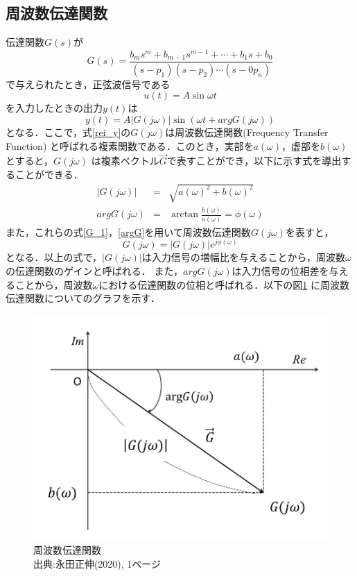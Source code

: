 \documentclass[a4paper,11pt]{jsarticle}
\begin{document}
\subsection{周波数伝達関数}
伝達関数$G(s)$が\\
\begin{equation}
  G(s) = \frac{b_ms^m+b_{m-1}s^{m-1}+\cdots + b_1s+b_0}{(s-p_1)(s-p_2)\cdots (s-0p_n)}
\end{equation}
で与えられたとき，正弦波信号である\\
\begin{equation}
  u(t) = A\sin{\omega t}
\end{equation}
を入力したときの出力$y(t)$は\\
\begin{equation}
  y(t) = A|G(j\omega)| \sin{(\omega t + argG(j\omega))}
  \label{rei_y}
\end{equation}
となる．ここで，式\ref{rei_y}の$G(j\omega)$は周波数伝達関数(Frequency Transfer Function)
と呼ばれる複素関数である．このとき，実部を$a(\omega)$，虚部を$b(\omega)$とすると，$G(j\omega)$
は複素ベクトル$\vec{G}$で表すことができ，以下に示す式を導出することができる．
\begin{eqnarray}
  |G(j\omega)| &=& \sqrt{a(\omega)^2 + b(\omega)^2}\\ \label{G_1}
  argG(j\omega) &=&  \arctan{\frac{b(\omega)}{a(\omega)}} = \phi (\omega) \label{argG}
\end{eqnarray}
また，これらの式\ref{G_1}，\ref{argG}を用いて周波数伝達関数$G(j\omega)$を表すと，
\begin{equation}
  G(j\omega)= |G(j\omega)|e^{j\phi (\omega)}
\end{equation}
となる．以上の式で，$|G(j\omega)|$は入力信号の増幅比を与えることから，周波数$\omega$の伝達関数のゲインと呼ばれる．
また，$argG(j\omega)$は入力信号の位相差を与えることから，周波数$\omega$における伝達関数の位相と呼ばれる．以下の図\ref{P:G_1}
に周波数伝達関数についてのグラフを示す．~\cite{text}
\begin{figure}[H]
  \centering
  \includegraphics[width=0.5\linewidth]{picture/G_1.png}
  \caption{周波数伝達関数\\出典:永田正伸(2020), 1ページ\cite{text}}
  \label{P:G_1}
\end{figure}
\end{document}
